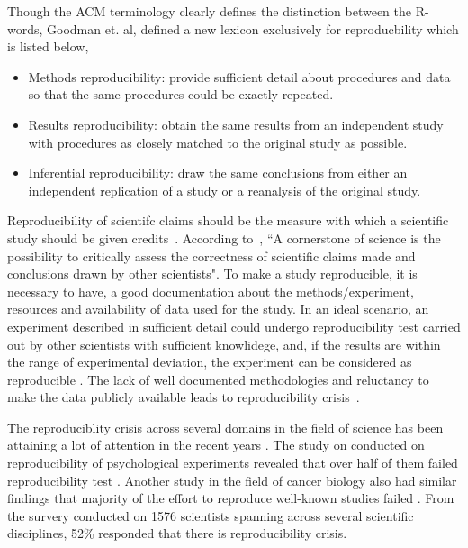 Though the ACM terminology clearly defines the distinction between the R-words, Goodman et. al, defined a new lexicon exclusively for reproducbility \cite{Goodman2016} which is listed below,
\begin{itemize}
\item {Methods reproducibility: provide sufficient detail about procedures and data so that the same procedures could be exactly repeated.}
\item {Results reproducibility: obtain the same results from an independent study with procedures as closely matched to the original study as possible.}
\item {Inferential reproducibility: draw the same conclusions from either an independent replication of a study or a reanalysis of the original study.}
\end{itemize}
Reproducibility of scientifc claims should be the measure with which a scientific study should be given credits~\cite{Estimating-reproducibility}. According to~\cite{Plesser2018}, ``A cornerstone of science is the possibility to critically assess the correctness of scientific claims made and conclusions drawn by other scientists".
To make a study reproducible, it is necessary to have, a good documentation about the methods/experiment, resources and availability of data used for the study. In an ideal scenario, an experiment described in sufficient detail could undergo reproducibility test carried out by other scientists with sufficient knowlidege, and, if the results are within the range of experimental deviation, the experiment can be considered as reproducible \cite{Plesser2018}. The lack of well documented methodologies and reluctancy to make the data publicly available leads to reproducibility crisis~\cite{Baker2016}.

The reproduciblity crisis across several domains in the field of science has been attaining a lot of attention in the recent years \cite{aac4716,Begley2012,Button2013,Baker2016,Estimating-reproducibility,Gla15}. The study on conducted on reproducibility of psychological experiments revealed that over half of them failed reproducibility test \cite{aac4716}. Another study in the field of cancer biology also had similar findings that majority of the effort to reproduce well-known studies failed \cite{Begley2012}. From the survery conducted on 1576 scientists spanning across several scientific disciplines, 52\% responded that there is reproducibility crisis.


